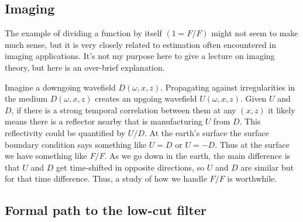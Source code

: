 
\subsection{Imaging}
The example of dividing a function by itself $(1=F/F)$ might not
seem to make much sense, but it is very closely related to estimation
often encountered in imaging applications.
It's not my purpose here to give a lecture on imaging theory, but
here is an over-brief explanation.
\par
Imagine a downgoing wavefield $D(\omega,x,z)$. Propagating against irregularities in  the medium $D(\omega, x , z )$
creates an upgoing wavefield $U(\omega,x,z)$.
Given $U$ and $D$, if there is a strong temporal correlation between them
at any $(x,z)$ it likely means there is a reflector nearby that is
manufacturing $U$ from $D$.
This reflectivity could be quantified by $U/D$.
At the earth's surface the surface boundary condition says something like
$U=D$ or $U=-D$.   Thus at the surface we have something like $F/F$.
As we go down in the earth, the main difference is that $U$ and $D$ get
time-shifted in opposite directions, so $U$ and $D$ are similar but
for that time difference.  Thus, a study of how we handle $F/F$ is worthwhile.

\subsection{Formal path to the low-cut filter}


